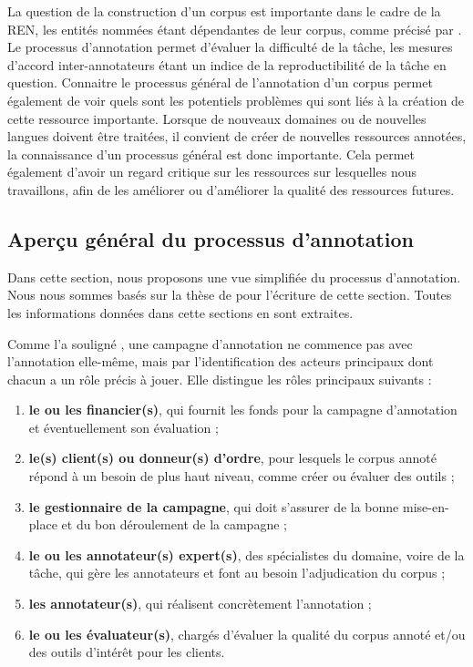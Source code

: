 \documentclass[12pt,a4paper,times,twoside,openright]{report}
\begin{document}
    La question de la construction d'un corpus est importante dans le cadre de la REN, les entités nommées étant dépendantes de leur corpus, comme précisé par \citet{ehrmann2008entites}. Le processus d'annotation permet d'évaluer la difficulté de la tâche, les mesures d'accord inter-annotateurs étant un indice de la reproductibilité de la tâche en question. Connaitre le processus général de l'annotation d'un corpus permet également de voir quels sont les potentiels problèmes qui sont liés à la création de cette ressource importante. Lorsque de nouveaux domaines ou de nouvelles langues doivent être traitées, il convient de créer de nouvelles ressources annotées, la connaissance d'un processus général est donc importante. Cela permet également d'avoir un regard critique sur les ressources sur lesquelles nous travaillons, afin de les améliorer ou d'améliorer la qualité des ressources futures.
    
        \subsection{Aperçu général du processus d'annotation}
        \label{subsec:corpora-overview}
Dans cette section, nous proposons une vue simplifiée du processus d'annotation. Nous nous sommes basés sur la thèse de \citet{fort2012ressources} pour l'écriture de cette section. Toutes les informations données dans cette sections en sont extraites.

Comme l'a souligné \citet{fort2012ressources}, une campagne d'annotation ne commence pas avec l'annotation elle-même, mais par l'identification des acteurs principaux dont chacun a un rôle précis à jouer. Elle distingue les rôles principaux suivants :

\begin{enumerate}
    \item \textbf{le ou les financier(s)}, qui fournit les fonds pour la campagne d'annotation et éventuellement son évaluation ;
    \item \textbf{le(s) client(s) ou donneur(s) d'ordre}, pour lesquels le corpus annoté répond à un besoin de plus haut niveau, comme créer ou évaluer des outils ;
    \item \textbf{le gestionnaire de la campagne}, qui doit s'assurer de la bonne mise-en-place et du bon déroulement de la campagne ;
    \item \textbf{le ou les annotateur(s) expert(s)}, des spécialistes du domaine, voire de la tâche, qui gère les annotateurs et font au besoin l'adjudication du corpus ;
    \item \textbf{les annotateur(s)}, qui réalisent concrètement l'annotation ;
    \item \textbf{le ou les évaluateur(s)}, chargés d'évaluer la qualité du corpus annoté et/ou des outils d'intérêt pour les clients.
\end{enumerate}
\end{document}
